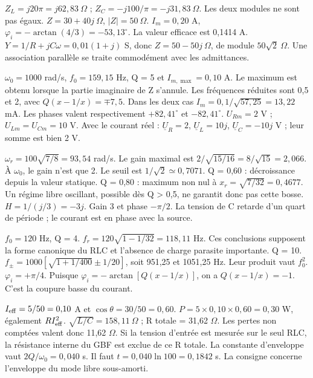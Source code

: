 $Z_L=j20\pi=j62{,}83\ \Omega$ ; $Z_C=-j100/\pi=-j31{,}83\ \Omega$. Les deux modules ne sont pas égaux.
$Z=30+40j\ \Omega$, $|Z|=50\ \Omega$. $I_m=0{,}20$ A, $\varphi_i=-\arctan(4/3)=-53{,}13^\circ$. La valeur efficace est 0,1414 A.
$Y=1/R+jC\omega=0{,}01(1+j)$ S, donc $Z=50-50j\ \Omega$, de module $50\sqrt2\ \Omega$. Une association parallèle se traite commodément avec les admittances.


$\omega_0=1000$ rad/s, $f_0=159{,}15$ Hz, Q = 5 et $I_{m,\max}=0{,}10$ A. Le maximum est obtenu lorsque la partie imaginaire de Z s’annule.
Les fréquences réduites sont 0,5 et 2, avec $Q(x-1/x)=\mp7{,}5$. Dans les deux cas $I_m=0{,}1/\sqrt{57{,}25}=13{,}22$ mA. Les phases valent respectivement $+82{,}41^\circ$ et $-82{,}41^\circ$.
$U_{Rm}=2$ V ; $U_{Lm}=U_{Cm}=10$ V. Avec le courant réel : $\underline U_R=2$, $\underline U_L=10j$, $\underline U_C=-10j$ V ; leur somme est bien 2 V.


$\omega_r=100\sqrt{7/8}=93{,}54$ rad/s. Le gain maximal est $2/\sqrt{15/16}=8/\sqrt{15}=2{,}066$. À $\omega_0$, le gain n’est que 2.
Le seuil est $1/\sqrt2\simeq0{,}7071$. Q = 0,60 : décroissance depuis la valeur statique. Q = 0,80 : maximum non nul à $x_r=\sqrt{7/32}=0{,}4677$. Un régime libre oscillant, possible dès Q > 0,5, ne garantit donc pas cette bosse.
$H=1/(j/3)=-3j$. Gain 3 et phase $-\pi/2$. La tension de C retarde d’un quart de période ; le courant est en phase avec la source.


$f_0=120$ Hz, Q = 4. $f_r=120\sqrt{1-1/32}=118{,}11$ Hz. Ces conclusions supposent la forme canonique du RLC et l’absence de charge parasite importante.
Q = 10. $f_\pm=1000[\sqrt{1+1/400}\pm1/20]$, soit 951,25 et 1051,25 Hz. Leur produit vaut $f_0^2$.
$\varphi_i=+\pi/4$. Puisque $\varphi_i=-\arctan[Q(x-1/x)]$, on a $Q(x-1/x)=-1$. C’est la coupure basse du courant.


$I_{\rm eff}=5/50=0{,}10$ A et $\cos\theta=30/50=0{,}60$. $P=5\times0{,}10\times0{,}60=0{,}30$ W, également $RI_{\rm eff}^2$.
$\sqrt{L/C}=158{,}11\ \Omega$ ; R totale = 31,62 $\Omega$. Les pertes non comptées valent donc 11,62 $\Omega$. Si la tension d’entrée est mesurée sur le seul RLC, la résistance interne du GBF est exclue de ce R totale.
La constante d’enveloppe vaut $2Q/\omega_0=0{,}040$ s. Il faut $t=0{,}040\ln100=0{,}1842$ s. La consigne concerne l’enveloppe du mode libre sous-amorti.


